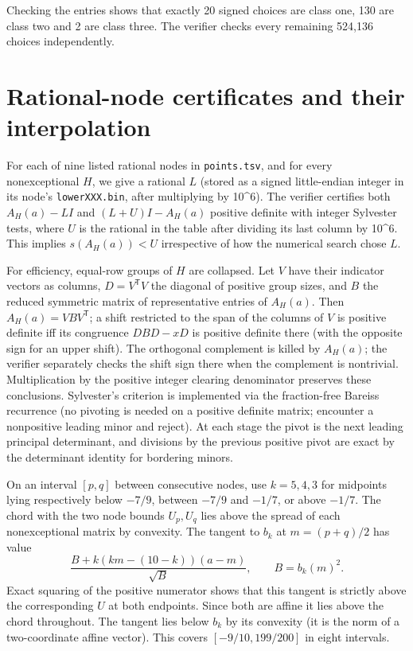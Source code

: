 \documentclass[11pt]{article}
\begin{document}
Checking the entries shows that exactly 20 signed choices are class one, 130 are class two and 2 are class three. The verifier checks every remaining 524,136 choices independently.

\section{Rational-node certificates and their interpolation}\label{rational-node-certificates-and-their-interpolation}

For each of nine listed rational nodes in \texttt{points.tsv}, and for every nonexceptional \(H\), we give a rational \(L\) (stored as a signed little-endian integer in its node's \texttt{lowerXXX.bin}, after multiplying by 10\^{}6). The verifier certifies both \(A_H(a)-LI\) and \((L+U)I-A_H(a)\) positive definite with integer Sylvester tests, where \(U\) is the rational in the table after dividing its last column by 10\^{}6. This implies \(s(A_H(a))<U\) irrespective of how the numerical search chose \(L\).

For efficiency, equal-row groups of \(H\) are collapsed. Let \(V\) have their indicator vectors as columns, \(D=V^{\mathsf T} V\) the diagonal of positive group sizes, and \(B\) the reduced symmetric matrix of representative entries of \(A_H(a)\). Then \(A_H(a)=VBV^{\mathsf T}\); a shift restricted to the span of the columns of \(V\) is positive definite iff its congruence \(DBD-xD\) is positive definite there (with the opposite sign for an upper shift). The orthogonal complement is killed by \(A_H(a)\); the verifier separately checks the shift sign there when the complement is nontrivial. Multiplication by the positive integer clearing denominator preserves these conclusions. Sylvester's criterion is implemented via the fraction-free Bareiss recurrence (no pivoting is needed on a positive definite matrix; encounter a nonpositive leading minor and reject). At each stage the pivot is the next leading principal determinant, and divisions by the previous positive pivot are exact by the determinant identity for bordering minors.

On an interval \([p,q]\) between consecutive nodes, use \(k=5,4,3\) for midpoints lying respectively below \(-7/9\), between \(-7/9\) and \(-1/7\), or above \(-1/7\). The chord with the two node bounds \(U_p,U_q\) lies above the spread of each nonexceptional matrix by convexity. The tangent to \(b_k\) at \(m=(p+q)/2\) has value
\[
\frac{B+k(km-(10-k))(a-m)}{\sqrt B},\qquad B=b_k(m)^2.
\]
Exact squaring of the positive numerator shows that this tangent is strictly above the corresponding \(U\) at both endpoints. Since both are affine it lies above the chord throughout. The tangent lies below \(b_k\) by its convexity (it is the norm of a two-coordinate affine vector). This covers \([-9/10,199/200]\) in eight intervals.
\end{document}
